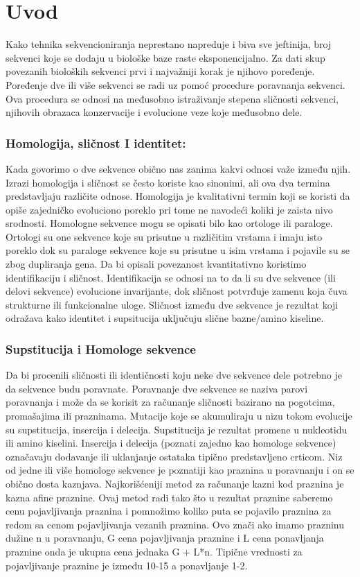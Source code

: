 \chapter{Uvod}

Kako tehnika sekvencioniranja neprestano napreduje i biva sve jeftinija, broj sekvenci koje se dodaju u biološke baze raste eksponencijalno.  Za dati skup povezanih bioloških sekvenci prvi i najvažniji korak je njihovo poređenje. Poređenje dve ili više sekvenci se radi uz pomoć procedure poravnanja sekvenci. Ova procedura se odnosi na međusobno istraživanje stepena sličnosti sekvenci, njihovih obrazaca konzervacije i evolucione veze koje međusobno dele.

\subsection{Homologija, sličnost I identitet:}
Kada govorimo o dve sekvence obično nas zanima kakvi odnosi važe između njih. Izrazi homologija i sličnost se često koriste kao sinonimi, ali ova dva termina predstavljaju različite odnose. Homologija je kvalitativni termin koji se koristi da opiše zajedničko evoluciono poreklo pri tome ne navodeći koliki je zaista nivo srodnosti. Homologne sekvence mogu se opisati bilo kao ortologe ili paraloge. Ortologi su one sekvence koje su prisutne u različitim vrstama i imaju isto poreklo dok su paraloge sekvence koje su prisutne u isim vrstama i pojavile su se zbog dupliranja gena. Da bi opisali povezanost kvantitativno koristimo identifikaciju i sličnost. Identifikacija se odnosi na to da li su dve sekvence (ili delovi sekvence) evolucione invarijante, dok sličnost potvrđuje zamenu koja čuva strukturne ili funkcionalne uloge. Sličnost između dve sekvence je rezultat koji odražava kako identitet i supsitucija uključuju slične bazne/amino kiseline.


\subsection{Supstitucija i Homologe sekvence}
Da bi procenili sličnosti ili identičnosti koju neke dve sekvence dele potrebno je da sekvence budu poravnate. Poravnanje dve sekvence se naziva parovi poravnanja i može da se korisit za računanje sličnosti bazirano na pogotcima, promašajima ili prazninama. Mutacije koje se akumuliraju u nizu tokom evolucije su supstitucija, insercija i delecija. Supstitucija je rezultat promene u nukleotidu ili amino kiselini. Insercija i delecija (poznati zajedno kao homologe sekvence) označavaju dodavanje ili uklanjanje ostataka tipično predstavljeno crticom. Niz od jedne ili više homologe sekvence je poznatiji kao praznina u poravnanju i on se obično dosta kaznjava. Najkorišćeniji metod za računanje kazni kod praznina je kazna afine praznine.  Ovaj metod radi tako što u rezultat praznine saberemo cenu pojavljivanja praznina i pomnožimo koliko puta se pojavilo praznina za redom sa cenom pojavljivanja vezanih praznina. Ovo znači ako imamo prazninu dužine n u poravnanju, G cena pojavljivanja praznine i L cena ponavljanja praznine onda je ukupna cena jednaka G + L*n. Tipične vrednosti za pojavljivanje praznine je između 10-15 a ponavljanje 1-2. 

